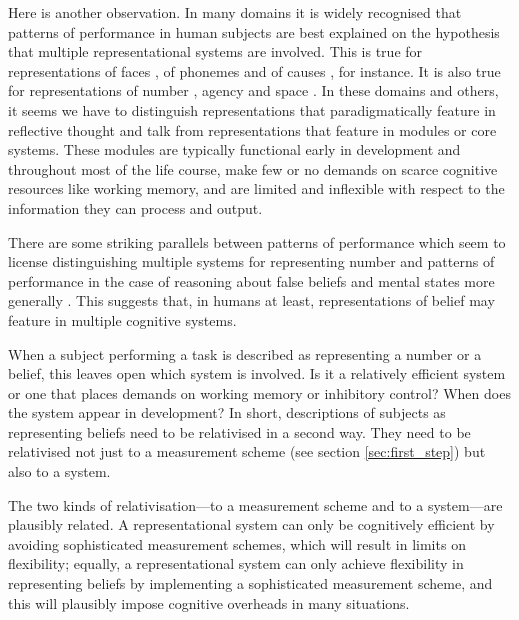 \documentclass[12pt,\papersize]{extarticle}
\begin{document}
Here is another observation.
In many domains it is widely recognised that patterns of performance in human subjects are best explained on the hypothesis that multiple representational systems are involved.
This is true for representations of faces \citep{Morton:1991lr},
of phonemes 
and
of causes \citep{Butterfill:2009vs}, 
for instance.
It is also true for representations of number \citep[e.g.][]{feigenson_tracking_2003}, agency and space \citep{Carey:1996hl}.
In these domains and others, it seems we have to distinguish  
	representations that paradigmatically feature in reflective thought and talk 
from
	representations that feature in modules or core systems.
These modules are typically functional early in development and throughout most of the life course, 
make few or no demands on scarce cognitive resources like working memory,
and are limited and inflexible with respect to the information they can process and output.

There are some striking parallels between patterns of performance which seem to license distinguishing multiple systems for representing number 
and 
patterns of performance in the case of reasoning about false beliefs and mental states more generally \citep{Apperly:2009ju}.
This suggests that, in humans at least, representations of belief may feature in multiple cognitive systems.

When a subject performing a task is described as representing a number or a belief, 
this leaves open which system is involved.
Is it a relatively efficient system or one that places demands on working memory or inhibitory control?  
When does the system appear in development?
In short, descriptions of subjects as representing beliefs need to be relativised in a second way.
They need to be relativised not just to  a measurement scheme (see section \vref{sec:first_step}) but also to a system.

The two kinds of relativisation---to a measurement scheme and to a system---are plausibly related.
A representational system can only be cognitively efficient by avoiding sophisticated measurement schemes, which will result in limits on flexibility;
equally, a representational system can only achieve flexibility in representing beliefs by implementing a sophisticated measurement scheme, and this will plausibly impose cognitive overheads in many situations.
\end{document}
